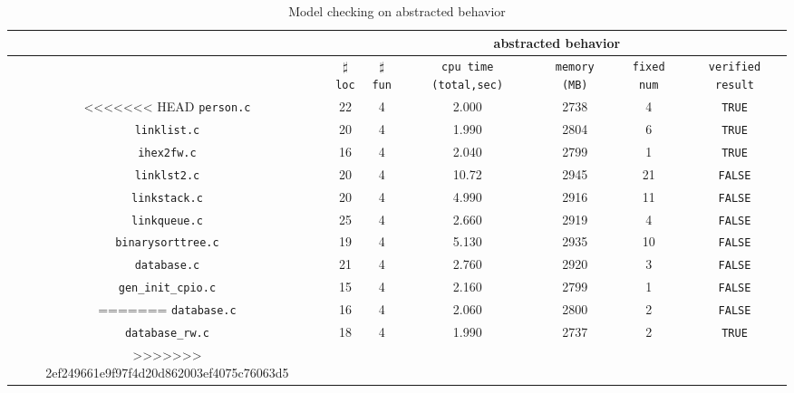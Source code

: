 \begin{table}
  \scriptsize
\begin{tabular}{|c|c|c|c|c|c|c|}
\hline
&\multicolumn{6}{|c|}{abstracted behavior} \\
\hline
 &$\sharp$\texttt{loc} & $\sharp$\texttt{fun} & \texttt{cpu time (total,sec)} & \texttt{memory (MB)} & \texttt{fixed num} & \texttt{verified result} \\
\hline
<<<<<<< HEAD
\texttt{person.c} & 22 & 4 & 2.000 & 2738 & 4 & \texttt{TRUE}  \\
\hline
\texttt{linklist.c} &  20 & 4 & 1.990 & 2804 & 6 & \texttt{TRUE} \\
\hline
\texttt{ihex2fw.c}  & 16 & 4 & 2.040 & 2799 & 1 & \texttt{TRUE} \\
\hline
\texttt{linklst2.c} & 20 & 4 & 10.72 & 2945 & 21 & \texttt{FALSE} \\
\hline
\texttt{linkstack.c} & 20 & 4 & 4.990 & 2916 & 11 & \texttt{FALSE} \\
\hline
\texttt{linkqueue.c} & 25 & 4 & 2.660 & 2919 & 4 & \texttt{FALSE} \\
\hline
\texttt{binarysorttree.c} & 19 & 4 & 5.130 & 2935 & 10 & \texttt{FALSE} \\
\hline
\texttt{database.c}  & 21 & 4 & 2.760 & 2920 & 3 & \texttt{FALSE} \\
\hline
\texttt{gen\_init\_cpio.c} & 15 & 4 & 2.160 & 2799 & 1 & \texttt{FALSE} \\
=======
\texttt{database.c} &  16 & 4 & 2.060 & 2800 & 2 & \texttt{FALSE} \\
\hline
\texttt{database\_rw.c} &  18 & 4 & 1.990 & 2737 & 2 & \texttt{TRUE} \\
>>>>>>> 2ef249661e9f97f4d20d862003ef4075c76063d5
\hline
\end{tabular}
\caption{Model checking on abstracted behavior}
\label{tb:mca}
\end{table}


